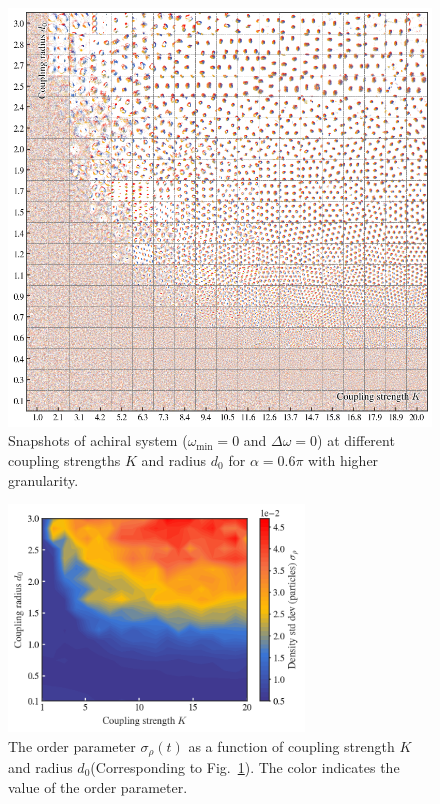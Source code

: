 \documentclass{article}
\begin{document}
\begin{figure}[H]
    \centering
    \includegraphics[width=\textwidth]{./figs/PhaseLagPatternFormation_varying_strengthK_and_distanceD0_phase_a1.88_Do0_aN2000_distuniform.png}
    \caption{
        \label{fig:snapshot0.6pi_chiral}
        Snapshots of achiral system ($\omega _{\min}=0$ and $\Delta \omega=0$) at different coupling strengths $K$ and radius $d_0$ for $\alpha = 0.6\pi$ with higher granularity. 
    }
\end{figure}

\begin{figure}[H]
    \centering
    \includegraphics[width=0.7\textwidth]{./figs/orderParameter_varying_strengthK_and_distanceD0.png}
    \caption{
        \label{fig:orderParameter_varying_strengthK_and_distanceD0}
        The order parameter $\sigma _{\rho}\left( t \right)$ as a function of coupling strength $K$ and radius $d_0$(Corresponding to Fig.~\ref{fig:snapshot0.6pi_chiral}). The color indicates the value of the order parameter.
    }
\end{figure}
\end{document}
